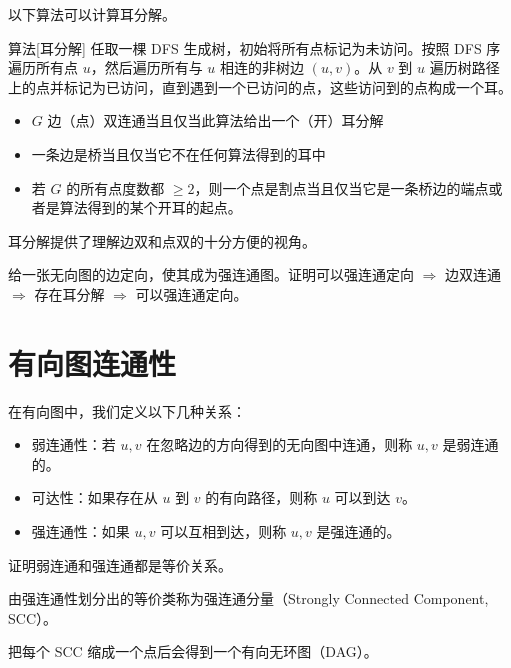以下算法可以计算耳分解。
\begin{descbox}{算法}[耳分解]
    任取一棵 DFS 生成树，初始将所有点标记为未访问。按照 DFS 序遍历所有点 $u$，然后遍历所有与 $u$ 相连的非树边 $(u,v)$。从 $v$ 到 $u$ 遍历树路径上的点并标记为已访问，直到遇到一个已访问的点，这些访问到的点构成一个耳。
\end{descbox}
\begin{theorem}
    \begin{itemize}
        \item $G$ 边（点）双连通当且仅当此算法给出一个（开）耳分解
        \item 一条边是桥当且仅当它不在任何算法得到的耳中
        \item 若 $G$ 的所有点度数都 $\ge 2$，则一个点是割点当且仅当它是一条桥边的端点或者是算法得到的某个开耳的起点。
    \end{itemize}
\end{theorem}

耳分解提供了理解边双和点双的十分方便的视角。
\begin{example}[强连通定向]
    给一张无向图的边定向，使其成为强连通图。证明可以强连通定向 $\Longrightarrow$ 边双连通 $\Longrightarrow$ 存在耳分解 $\Longrightarrow$ 可以强连通定向。
\end{example}


\section{有向图连通性}



\begin{definition}[连通性]

在有向图中，我们定义以下几种关系：

\begin{itemize}
    \item 弱连通性：若 $u,v$ 在忽略边的方向得到的无向图中连通，则称 $u,v$ 是弱连通的。
    \item 可达性：如果存在从 $u$ 到 $v$ 的有向路径，则称 $u$ 可以到达 $v$。
    \item 强连通性：如果 $u,v$ 可以互相到达，则称 $u,v$ 是强连通的。
\end{itemize}
\end{definition}
\begin{exercise}
    证明弱连通和强连通都是等价关系。
\end{exercise}
\begin{definition}[强连通分量]
    由强连通性划分出的等价类称为强连通分量（Strongly Connected Component, SCC）。
\end{definition}
\begin{theorem}
    把每个 SCC 缩成一个点后会得到一个有向无环图（DAG）。
\end{theorem}

